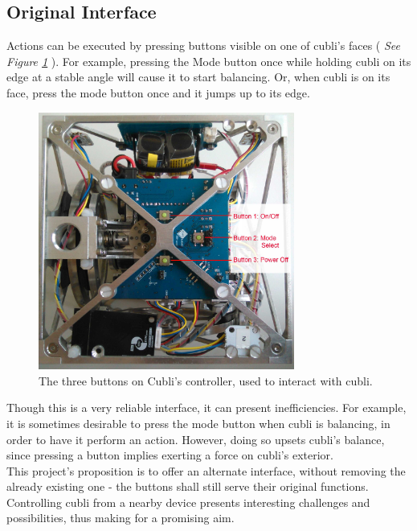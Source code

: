 \subsection{Original Interface}
 
Actions can be executed by pressing buttons visible on one of cubli's faces ( \textit{See Figure \ref{img:Buttons}} ). For example, pressing the Mode button once while holding cubli on its edge at a stable angle will cause it to start balancing. Or, when cubli is on its face, press the mode button once and it jumps up to its edge.\\

\begin{figure}[ht]
   \centering
   \includegraphics[width=0.75\textwidth]{img/Buttons.jpg}
   \caption{The three buttons on Cubli's controller, used to interact with cubli.}
   \label{img:Buttons}
\end{figure}

Though this is a very reliable interface, it can present inefficiencies. For example, it is sometimes desirable to press the mode button when cubli is balancing, in order to have it perform an action. However, doing so upsets cubli's balance, since pressing a button implies exerting a force on cubli's exterior.\\

This project's proposition is to offer an alternate interface, without removing the already existing one - the buttons shall still serve their original functions. Controlling cubli from a nearby device presents interesting challenges and possibilities, thus making for a promising aim.

